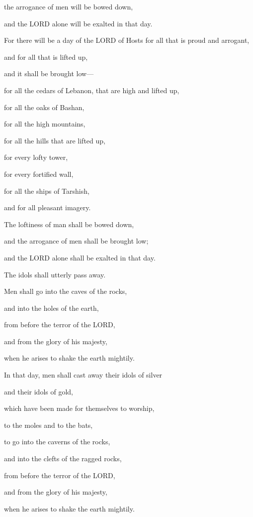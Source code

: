 the arrogance of men will be bowed down,

and the LORD alone will be exalted in that day.


\vspace{\baselineskip} \myverse{}For there will be a day of the LORD of Hosts for all that is
proud and arrogant,

and for all that is lifted up,

and it shall be brought low—

\myverse{}for all the cedars of Lebanon, that are high and lifted
up,

for all the oaks of Bashan,

\myverse{}for all the high mountains,

for all the hills that are lifted up,

\myverse{}for every lofty tower,

for every fortified wall,

\myverse{}for all the ships of Tarshish,

and for all pleasant imagery.

\myverse{}The loftiness of man shall be bowed down,

and the arrogance of men shall be brought low;

and the LORD alone shall be exalted in that day.

\myverse{}The idols shall utterly pass away.

\myverse{}Men shall go into the caves of the rocks,

and into the holes of the earth,

from before the terror of the LORD,

and from the glory of his majesty,

when he arises to shake the earth mightily.

\myverse{}In that day, men shall cast away their idols of silver

and their idols of gold,

which have been made for themselves to worship,

to the moles and to the bats,

\myverse{}to go into the caverns of the rocks,

and into the clefts of the ragged rocks,

from before the terror of the LORD,

and from the glory of his majesty,

when he arises to shake the earth mightily.

